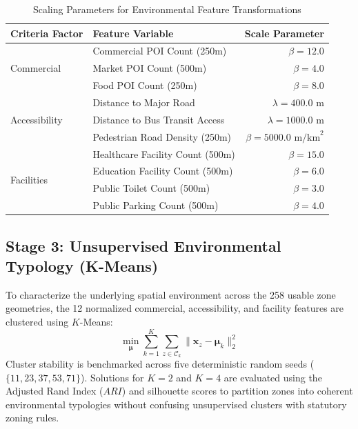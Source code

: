 \begin{table}[t]
    \caption{Scaling Parameters for Environmental Feature Transformations}
    \label{tab:mcda_scales}
    \centering
    \begin{tabular}{llr}
        \toprule
        \textbf{Criteria Factor} & \textbf{Feature Variable} & \textbf{Scale Parameter} \\
        \midrule
        \multirow{3}{*}{Commercial} & Commercial POI Count (250m) & $\beta = 12.0$ \\
                                   & Market POI Count (500m) & $\beta = 4.0$ \\
                                   & Food POI Count (250m) & $\beta = 8.0$ \\
        \midrule
        \multirow{3}{*}{Accessibility} & Distance to Major Road & $\lambda = 400.0\text{ m}$ \\
                                      & Distance to Bus Transit Access & $\lambda = 1000.0\text{ m}$ \\
                                      & Pedestrian Road Density (250m) & $\beta = 5000.0\text{ m/km}^2$ \\
        \midrule
        \multirow{4}{*}{Facilities}    & Healthcare Facility Count (500m) & $\beta = 15.0$ \\
                                      & Education Facility Count (500m) & $\beta = 6.0$ \\
                                      & Public Toilet Count (500m) & $\beta = 3.0$ \\
                                      & Public Parking Count (500m) & $\beta = 4.0$ \\
        \bottomrule
    \end{tabular}
\end{table}

\subsection{Stage 3: Unsupervised Environmental Typology (K-Means)}
\label{sec:meth_stage3}

To characterize the underlying spatial environment across the 258 usable zone geometries, the 12 normalized commercial, accessibility, and facility features are clustered using $K$-Means:
\begin{equation}
    \min_{\mathbf{\mu}} \sum_{k=1}^K \sum_{z \in \mathcal{C}_k} \|\mathbf{x}_z - \mathbf{\mu}_k\|_2^2
    \label{eq:kmeans}
\end{equation}
Cluster stability is benchmarked across five deterministic random seeds ($\{11, 23, 37, 53, 71\}$). Solutions for $K=2$ and $K=4$ are evaluated using the Adjusted Rand Index ($ARI$) and silhouette scores to partition zones into coherent environmental typologies without confusing unsupervised clusters with statutory zoning rules.


